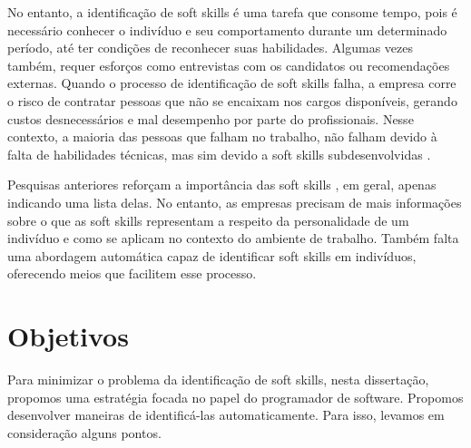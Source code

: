 No entanto, a identificação de soft skills é uma tarefa que consome tempo, pois é necessário conhecer o indivíduo e seu comportamento durante um determinado período, até ter condições de reconhecer suas habilidades. Algumas vezes também, requer esforços como entrevistas com os candidatos ou recomendações externas.
Quando o processo de identificação de soft skills falha, a empresa corre o risco de contratar pessoas que não se encaixam nos cargos disponíveis, gerando custos desnecessários e mal desempenho por parte do profissionais.
Nesse contexto, a maioria das pessoas que falham no trabalho, não falham devido à falta de habilidades técnicas, mas sim devido a soft skills subdesenvolvidas \cite{bolton:86, mcgee:96}. %

Pesquisas anteriores reforçam a importância das soft skills \cite {ahmed:12, sterling:03, rehman:12},
em geral, apenas indicando uma lista delas.
No entanto, as empresas precisam de mais informações
sobre o que as soft skills representam a respeito da personalidade de um indivíduo e como se aplicam no contexto do ambiente de trabalho.
Também falta uma abordagem automática capaz de identificar soft skills em indivíduos, oferecendo meios que facilitem esse processo.


\section{Objetivos}

Para minimizar o problema da identificação de soft skills, nesta dissertação, propomos uma estratégia focada no papel do programador de software.
Propomos desenvolver maneiras de identificá-las automaticamente. Para isso, levamos em consideração alguns pontos.


